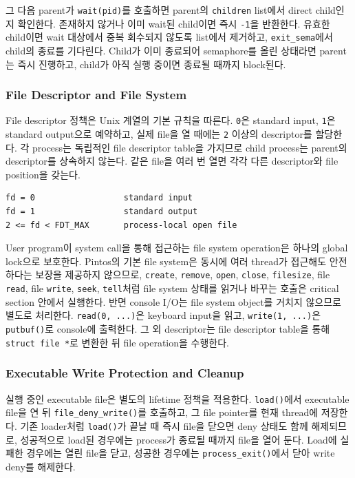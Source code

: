 \documentclass[conference]{IEEEtran}
\newcommand{\codefont}[1]{\texttt{\color{darkmagenta}#1}}
\begin{document}
그 다음 parent가 \codefont{wait(pid)}를 호출하면 parent의 \codefont{children} list에서 direct child인지 확인한다. 존재하지 않거나 이미 wait된 child이면 즉시 \codefont{-1}을 반환한다. 유효한 child이면 wait 대상에서 중복 회수되지 않도록 list에서 제거하고, \codefont{exit\_sema}에서 child의 종료를 기다린다. Child가 이미 종료되어 semaphore를 올린 상태라면 parent는 즉시 진행하고, child가 아직 실행 중이면 종료될 때까지 block된다.

\subsubsection{File Descriptor and File System}

File descriptor 정책은 Unix 계열의 기본 규칙을 따른다. \codefont{0}은 standard input, \codefont{1}은 standard output으로 예약하고, 실제 file을 열 때에는 \codefont{2} 이상의 descriptor를 할당한다. 각 process는 독립적인 file descriptor table을 가지므로 child process는 parent의 descriptor를 상속하지 않는다. 같은 file을 여러 번 열면 각각 다른 descriptor와 file position을 갖는다.

\begin{lstlisting}[numbers=none]
fd = 0                  standard input
fd = 1                  standard output
2 <= fd < FDT_MAX       process-local open file
\end{lstlisting}

User program이 system call을 통해 접근하는 file system operation은 하나의 global lock으로 보호한다. Pintos의 기본 file system은 동시에 여러 thread가 접근해도 안전하다는 보장을 제공하지 않으므로, \codefont{create}, \codefont{remove}, \codefont{open}, \codefont{close}, \codefont{filesize}, file \codefont{read}, file \codefont{write}, \codefont{seek}, \codefont{tell}처럼 file system 상태를 읽거나 바꾸는 호출은 critical section 안에서 실행한다. 반면 console I/O는 file system object를 거치지 않으므로 별도로 처리한다. \codefont{read(0, ...)}은 keyboard input을 읽고, \codefont{write(1, ...)}은 \codefont{putbuf()}로 console에 출력한다. 그 외 descriptor는 file descriptor table을 통해 \codefont{struct file *}로 변환한 뒤 file operation을 수행한다.

\subsubsection{Executable Write Protection and Cleanup}

실행 중인 executable file은 별도의 lifetime 정책을 적용한다. \codefont{load()}에서 executable file을 연 뒤 \codefont{file\_deny\_write()}를 호출하고, 그 file pointer를 현재 thread에 저장한다. 기존 loader처럼 \codefont{load()}가 끝날 때 즉시 file을 닫으면 deny 상태도 함께 해제되므로, 성공적으로 load된 경우에는 process가 종료될 때까지 file을 열어 둔다. Load에 실패한 경우에는 열린 file을 닫고, 성공한 경우에는 \codefont{process\_exit()}에서 닫아 write deny를 해제한다.
\end{document}
